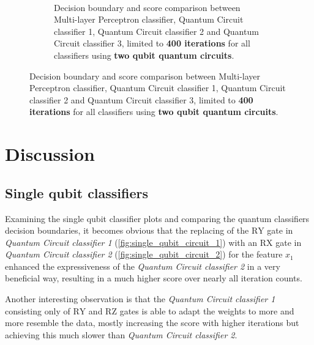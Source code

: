 \begin{figure}[!h]
    \\[2ex]
    \begin{subfigure}{1.0\textwidth}
        \centering
        \caption{Decision boundary and score comparison between Multi-layer Perceptron classifier, Quantum Circuit classifier 1, Quantum Circuit classifier 2 and Quantum Circuit classifier 3, limited to \textbf{400 iterations} for all classifiers using \textbf{two qubit quantum circuits}.}
        \label{fig:2QubitClassifiers_400Iterations}
    \end{subfigure}
\end{figure}

\clearpage
\section{Discussion}

\subsection{Single qubit classifiers}
Examining the single qubit classifier plots and comparing the quantum classifiers decision boundaries, it becomes obvious that the replacing of the $\mathrm{RY}$ gate in \textit{Quantum Circuit classifier 1} (\ref{fig:single_qubit_circuit_1}) with an $\mathrm{RX}$ gate in \textit{Quantum Circuit classifier 2} (\ref{fig:single_qubit_circuit_2}) for the feature $x_1$ enhanced the expressiveness of the \textit{Quantum Circuit classifier 2} in a very beneficial way, resulting in a much higher score over nearly all iteration counts.

Another interesting observation is that the \textit{Quantum Circuit classifier 1} consisting only of $\mathrm{RY}$ and $\mathrm{RZ}$ gates is able to adapt the weights to more and more resemble the data, mostly increasing the score with higher iterations but achieving this much slower than \textit{Quantum Circuit classifier 2}.

